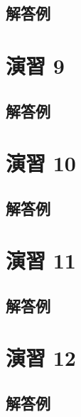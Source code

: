 \documentclass[
  12pt,
]{book}
\begin{document}
\hypertarget{ux89e3ux7b54ux4f8b-7}{%
\subsection*{解答例}\label{ux89e3ux7b54ux4f8b-7}}

\hypertarget{ux6f14ux7fd2-9-1}{%
\section*{演習 9}\label{ux6f14ux7fd2-9-1}}

\hypertarget{ux89e3ux7b54ux4f8b-8}{%
\subsection*{解答例}\label{ux89e3ux7b54ux4f8b-8}}

\hypertarget{ux6f14ux7fd2-10-2}{%
\section*{演習 10}\label{ux6f14ux7fd2-10-2}}

\hypertarget{ux89e3ux7b54ux4f8b-9}{%
\subsection*{解答例}\label{ux89e3ux7b54ux4f8b-9}}

\hypertarget{ux6f14ux7fd2-11-1}{%
\section*{演習 11}\label{ux6f14ux7fd2-11-1}}

\hypertarget{ux89e3ux7b54ux4f8b-10}{%
\subsection*{解答例}\label{ux89e3ux7b54ux4f8b-10}}

\hypertarget{ux6f14ux7fd2-12-1}{%
\section*{演習 12}\label{ux6f14ux7fd2-12-1}}

\hypertarget{ux89e3ux7b54ux4f8b-11}{%
\subsection*{解答例}\label{ux89e3ux7b54ux4f8b-11}}
\end{document}
